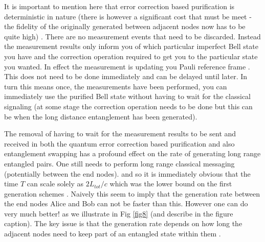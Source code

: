 \documentclass[twocolumn, aps, rmp, amsmath, amssymb, nofootinbib, superscriptaddress, longbibliography, floatfix, table-of-contents, eqsecnum]{revtex4-1}
\begin{document}
It is important to mention here that error correction based purification is deterministic in nature (there is however a significant cost that must be meet - the fidelity of the originally generated between adjacent nodes now has to be quite high) \cite{jiang09,Aschauer2004} . There are no measurement events that need to be discarded. Instead the measurement results only inform you of which particular imperfect Bell state you have and the correction operation required to get you to the particular state you wanted. In effect the measurement is updating you Pauli reference frame \cite{Knill2005}. This does not need to be done immediately and can be delayed until later. In turn this means once, the measurements have been performed, you can immediately use the purified Bell state without having to wait for the classical signaling (at some stage the correction operation needs to be done but this can be when the long distance entanglement has been generated). 

The removal of having to wait for the measurement results to be sent and received in both the quantum error correction based purification and also entanglement swapping has a profound effect on the rate of generating long range entangled pairs. One still needs to perform long range classical messaging (potentially between the end nodes). and so it is immediately obvious that the time $T$ can scale solely as $2 L_{tot}/c$ which was the lower bound on the first generation schemes \cite{munro10}.  Naively this seem to imply that the generation rate between the end nodes Alice and Bob can not be faster than this. However one can do very much better! as we illustrate in Fig \ref{fig8} (and describe in the figure caption). The key issue is that the generation rate depends on how long the adjacent nodes need to keep part of an entangled state within them \cite{jiang09,munro10,Muralidharan2016}. 
\end{document}
